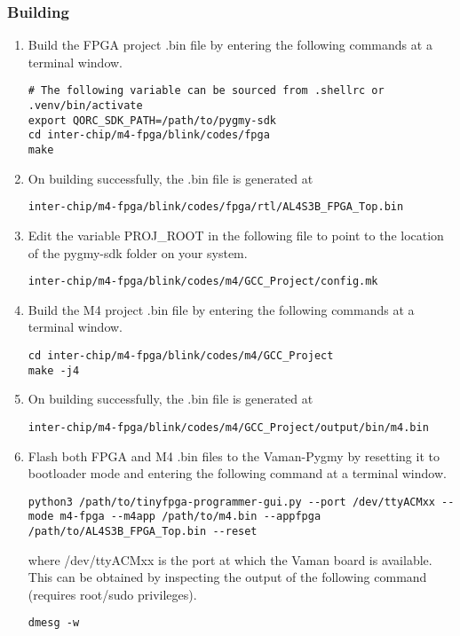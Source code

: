 \subsubsection{Building}
\begin{enumerate}
    \item Build the FPGA project .bin file by entering the following commands at
    a terminal window.
    \begin{lstlisting}
# The following variable can be sourced from .shellrc or .venv/bin/activate
export QORC_SDK_PATH=/path/to/pygmy-sdk
cd inter-chip/m4-fpga/blink/codes/fpga
make
    \end{lstlisting}
    \item On building successfully, the .bin file is generated at
    \begin{lstlisting}
inter-chip/m4-fpga/blink/codes/fpga/rtl/AL4S3B_FPGA_Top.bin
    \end{lstlisting}
    \item Edit the variable PROJ\_ROOT in the following file to point to the
    location of the pygmy-sdk folder on your system.
    \begin{lstlisting}
inter-chip/m4-fpga/blink/codes/m4/GCC_Project/config.mk
    \end{lstlisting}
    \item Build the M4 project .bin file by entering the following commands at a
    terminal window.
    \begin{lstlisting}
cd inter-chip/m4-fpga/blink/codes/m4/GCC_Project
make -j4
    \end{lstlisting}
    \item On building successfully, the .bin file is generated at
    \begin{lstlisting}
inter-chip/m4-fpga/blink/codes/m4/GCC_Project/output/bin/m4.bin
    \end{lstlisting}
    \item Flash both FPGA and M4 .bin files to the Vaman-Pygmy by resetting it
    to bootloader mode and entering the following command at a terminal window.
    \begin{lstlisting}
python3 /path/to/tinyfpga-programmer-gui.py --port /dev/ttyACMxx --mode m4-fpga --m4app /path/to/m4.bin --appfpga /path/to/AL4S3B_FPGA_Top.bin --reset
    \end{lstlisting}
    where /dev/ttyACMxx is the port at which the Vaman board is available. This
    can be obtained by inspecting the output of the following command (requires
    root/sudo privileges).
    \begin{lstlisting}
dmesg -w
    \end{lstlisting}
\end{enumerate}

